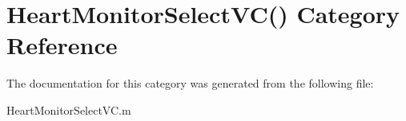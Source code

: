 \hypertarget{category_heart_monitor_select_v_c_07_08}{\section{Heart\-Monitor\-Select\-V\-C() Category Reference}
\label{category_heart_monitor_select_v_c_07_08}
}


The documentation for this category was generated from the following file\-:\begin{DoxyCompactItemize}
\item 
Heart\-Monitor\-Select\-V\-C.\-m\end{DoxyCompactItemize}
